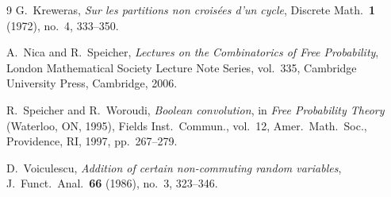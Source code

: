 \documentclass[11pt]{article}
\theoremstyle{definition}
\begin{document}
\begin{thebibliography}{9}
G.~Kreweras, \emph{Sur les partitions non crois\'ees d'un cycle}, Discrete Math.\ \textbf{1} (1972), no.~4, 333--350.

A.~Nica and R.~Speicher, \emph{Lectures on the Combinatorics of Free Probability}, London Mathematical Society Lecture Note Series, vol.~335, Cambridge University Press, Cambridge, 2006.

R.~Speicher and R.~Woroudi, \emph{Boolean convolution}, in \emph{Free Probability Theory} (Waterloo, ON, 1995), Fields Inst.\ Commun., vol.~12, Amer.\ Math.\ Soc., Providence, RI, 1997, pp.~267--279.

D.~Voiculescu, \emph{Addition of certain non-commuting random variables}, J.~Funct.\ Anal.\ \textbf{66} (1986), no.~3, 323--346.
\end{thebibliography}
\end{document}
